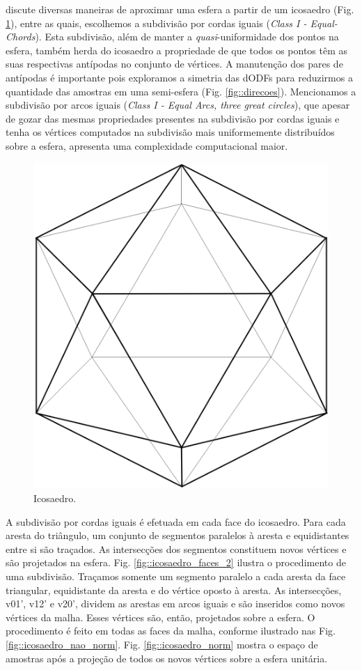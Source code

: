 \documentclass[
    12pt,                %
    oneside,            %
    a4paper,            %
    english,            %
    french,                %
    spanish,            %
    brazil                %
    ]{abntex2}
\begin{document}
 
 discute diversas maneiras de aproximar uma esfera a partir de um icosaedro (Fig. \ref{fig::icosaedro}), entre as quais, escolhemos a subdivisão por cordas iguais  (\textit{Class I - Equal-Chords}). Esta subdivisão, além de manter a \textit{quasi}-uniformidade dos pontos na esfera, também herda do icosaedro a propriedade de que todos os pontos têm as suas respectivas antípodas no conjunto de vértices. A manutenção dos pares de antípodas é importante pois exploramos a simetria das dODFs para reduzirmos a quantidade das amostras em uma semi-esfera (Fig. \ref{fig::direcoes}). Mencionamos a subdivisão por arcos iguais (\textit{Class I - Equal Arcs, three great circles}), que apesar de gozar das mesmas propriedades presentes na subdivisão por cordas iguais e tenha os vértices computados na subdivisão mais uniformemente distribuídos sobre a esfera, apresenta uma complexidade computacional maior.

\begin{figure}[H]
    \centering
    \includegraphics[width=.3\linewidth, angle=0]{figs/HARDI/icosaedro.png}
    \caption{
    Icosaedro.
    }
    \label{fig::icosaedro}
   \hspace{1pt}
\end{figure}

A subdivisão por cordas iguais é efetuada em cada face do icosaedro. Para cada aresta do triângulo, um conjunto de segmentos paralelos à aresta e equidistantes entre si são traçados. As intersecções dos segmentos constituem novos vértices e são projetados na esfera. Fig. \ref{fig::icosaedro_faces_2} ilustra o procedimento de uma subdivisão. Traçamos somente um segmento paralelo a cada aresta da face triangular, equidistante da aresta e do vértice oposto à aresta. As intersecções, v01', v12' e v20', dividem as arestas em arcos iguais e são inseridos como novos vértices da malha. Esses vértices são, então, projetados sobre a esfera. O procedimento é feito em todas as faces da malha, conforme ilustrado nas Fig.\ref{fig::icosaedro_nao_norm}. Fig. \ref{fig::icosaedro_norm} mostra o espaço de amostras após a projeção de todos os novos vértices sobre a esfera unitária.
\end{document}
